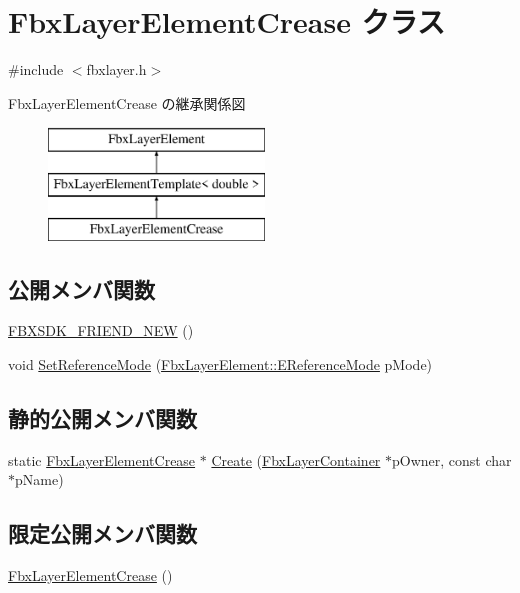 \hypertarget{class_fbx_layer_element_crease}{}\section{Fbx\+Layer\+Element\+Crease クラス}
\label{class_fbx_layer_element_crease}


{\ttfamily \#include $<$fbxlayer.\+h$>$}

Fbx\+Layer\+Element\+Crease の継承関係図\begin{figure}[H]
\begin{center}
\leavevmode
\includegraphics[height=3.000000cm]{class_fbx_layer_element_crease}
\end{center}
\end{figure}
\subsection*{公開メンバ関数}
\begin{DoxyCompactItemize}
\item 
\hyperlink{class_fbx_layer_element_crease_a5b85454e2b22d8349a2134d00e7bdaea}{F\+B\+X\+S\+D\+K\+\_\+\+F\+R\+I\+E\+N\+D\+\_\+\+N\+EW} ()
\item 
void \hyperlink{class_fbx_layer_element_crease_aa670c1f3cfbcef29d1080b6c9c4e8e34}{Set\+Reference\+Mode} (\hyperlink{class_fbx_layer_element_a00f04654580ca9b2f5d292c11abd83fc}{Fbx\+Layer\+Element\+::\+E\+Reference\+Mode} p\+Mode)
\end{DoxyCompactItemize}
\subsection*{静的公開メンバ関数}
\begin{DoxyCompactItemize}
\item 
static \hyperlink{class_fbx_layer_element_crease}{Fbx\+Layer\+Element\+Crease} $\ast$ \hyperlink{class_fbx_layer_element_crease_a658cc8d2e86ed9c86663e6afc72d229c}{Create} (\hyperlink{class_fbx_layer_container}{Fbx\+Layer\+Container} $\ast$p\+Owner, const char $\ast$p\+Name)
\end{DoxyCompactItemize}
\subsection*{限定公開メンバ関数}
\begin{DoxyCompactItemize}
\item 
\hyperlink{class_fbx_layer_element_crease_a7dc7dd72a8045344bd1502dcc4fbf728}{Fbx\+Layer\+Element\+Crease} ()
\end{DoxyCompactItemize}
